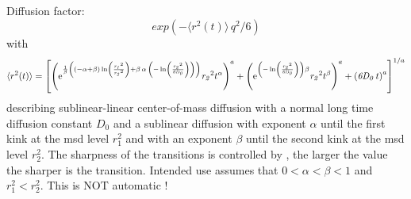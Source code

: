 \documentclass[11pt,fleqn]{book} %
\begin{document}
\begin{exercise}
Diffusion factor:
\begin{equation}
exp\left (-\langle r^2(t) \rangle \, q^2/6 \right)
\end{equation}
with
\begin{equation}
\label{eq:subdiff2}
\langle r^2(t) \rangle = \left [
{ \left( {{\rm e}^{{\frac {1}{\beta} \left(  \left( -\alpha+
\beta \right) \ln  \left( {\frac {{{\it r_1}}^{2}}{{{\it r_2}}^{2}}}
 \right) +\beta\,\alpha\, \left(  -\ln  \left( {\frac {{{\it r_2}}^{2}}{{\it 6 D_0}}} \right) 
 \right)  \right) }}}{{\it r_2}}^{2}{t}^{\alpha} \right) ^{a}+
 \left( {{\rm e}^{ \left(  -\ln  \left( {\frac {{{\it r_2}}^{2}}{{\it 6 D_0}}} \right) 
 \right) \beta}}{{\it r_2}}^{2}{t}^{\beta} \right) ^{a}+
 \left( {\it 6 D_0}\,t \right) ^{a}} \right ]^{1/a}
\end{equation}
describing sublinear-linear center-of-mass diffusion with a normal long time diffusion constant
${D_0}$ and a sublinear diffusion with exponent ${\alpha}$ until the first kink at the msd level
${r_1^2}$ and with an exponent ${\beta}$ until the second kink at the msd level ${r_2^2}$. 
The sharpness of the transitions is controlled by , the larger the value the sharper is the transition.
Intended use assumes that ${0 < \alpha < \beta < 1}$  and ${r_1^2 < r_2^2}$. 
This is NOT automatic !
\end{exercise}
\end{document}
